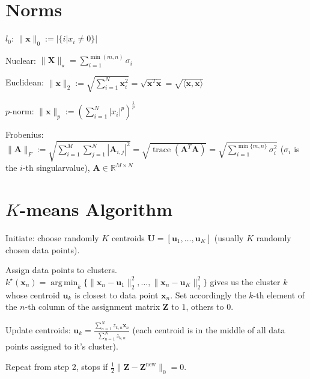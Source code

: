 \documentclass[a4paper, 11pt, landscape]{article}
\DeclareMathOperator*{\argmin}{arg\,min}
\begin{document}
\begin{multicols*}{3}
\section{Norms}
\begin{inparadesc}
	\item[$l_0$:] $\|\mathbf{x}\|_0 := |\{i | x_i \neq 0\}|$
	\item[Nuclear:] $\|\mathbf{X}\|_\star = \sum_{i=1}^{\min(m, n)} \sigma_i$
	\item[Euclidean:] $\|\mathbf{x}\|_2 := \sqrt{\sum_{i=1}^{N} \mathbf{x}_i^2} = \sqrt{\mathbf{x}^T \mathbf{x}} = \sqrt{\langle \mathbf{x}, \mathbf{x} \rangle}$
	\item[$p$-norm:] $\|\mathbf{x}\|_p := \left( \sum_{i=1}^{N} |x_i|^p \right)^{\frac{1}{p}}$
	\item[Frobenius:] $\|\mathbf{A}\|_F :=\allowbreak \sqrt{\sum_{i=1}^{M} \sum_{j=1}^{N} |\mathbf{A}_{i, j}|^2} =\allowbreak \sqrt{\operatorname{trace}(\mathbf{A}^T \mathbf{A})} =\allowbreak \sqrt{\sum_{i=1}^{\min\{m, n\}} \sigma_i^2}$ ($\sigma_i$ is the $i$-th singularvalue), $\mathbf{A} \in \mathbb{R}^{M \times N}$
\end{inparadesc}

\section{$K$-means Algorithm}
\begin{inparaenum}
	\item Initiate: choose randomly $K$ centroids $\mathbf{U} = [\mathbf{u}_1, \ldots, \mathbf{u}_K]$ (usually $K$ randomly chosen data points).
	\item Assign data points to clusters. $k^\star(\mathbf{x}_n) = \argmin_k \{ \|\mathbf{x}_n - \mathbf{u}_1\|_2^2, \ldots, \|\mathbf{x}_n - \mathbf{u}_K\|_2^2 \}$ gives us the cluster $k$ whose centroid $\mathbf{u}_k$ is closest to data point $\mathbf{x}_n$. Set accordingly the $k$-th element of the $n$-th column of the assignment matrix $\mathbf{Z}$ to $1$, others to $0$.
	\item Update centroids: $\mathbf{u}_k = \frac{\sum_{n=1}^N z_{k,n} \mathbf{x}_n}{\sum_{n=1}^N z_{k,n}}$ (each centroid is in the middle of all data points assigned to it's cluster).
	\item Repeat from step 2, stops if $\frac{1}{2} \|\mathbf{Z} - \mathbf{Z}^\text{new}\|_0 = 0$.
\end{inparaenum}


\end{multicols*}
\end{document}
